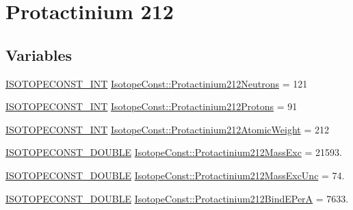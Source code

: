 \hypertarget{group___isotope_const-_protactinium-_pa212}{}\section{Protactinium 212}
\label{group___isotope_const-_protactinium-_pa212}
\subsection*{Variables}
\begin{DoxyCompactItemize}
\item 
\mbox{\hyperlink{group___isotope_const-_macros_ga5f18360b3e99483a35c32d789e62621c}{I\+S\+O\+T\+O\+P\+E\+C\+O\+N\+S\+T\+\_\+\+I\+NT}} \mbox{\hyperlink{group___isotope_const-_protactinium-_pa212_ga4a3f992ef16926a17d884f79e3f30dc9}{Isotope\+Const\+::\+Protactinium212\+Neutrons}} = 121
\item 
\mbox{\hyperlink{group___isotope_const-_macros_ga5f18360b3e99483a35c32d789e62621c}{I\+S\+O\+T\+O\+P\+E\+C\+O\+N\+S\+T\+\_\+\+I\+NT}} \mbox{\hyperlink{group___isotope_const-_protactinium-_pa212_ga0b88c59bc62d9ab09d5d554972699c88}{Isotope\+Const\+::\+Protactinium212\+Protons}} = 91
\item 
\mbox{\hyperlink{group___isotope_const-_macros_ga5f18360b3e99483a35c32d789e62621c}{I\+S\+O\+T\+O\+P\+E\+C\+O\+N\+S\+T\+\_\+\+I\+NT}} \mbox{\hyperlink{group___isotope_const-_protactinium-_pa212_gab0808915fbb114ea657ec5657615a8d1}{Isotope\+Const\+::\+Protactinium212\+Atomic\+Weight}} = 212
\item 
\mbox{\hyperlink{group___isotope_const-_macros_ga8f45a7272ce02c0b4c65c44636ed719a}{I\+S\+O\+T\+O\+P\+E\+C\+O\+N\+S\+T\+\_\+\+D\+O\+U\+B\+LE}} \mbox{\hyperlink{group___isotope_const-_protactinium-_pa212_gacb61aee2c5278a8a2a04923978b650a2}{Isotope\+Const\+::\+Protactinium212\+Mass\+Exc}} = 21593.
\item 
\mbox{\hyperlink{group___isotope_const-_macros_ga8f45a7272ce02c0b4c65c44636ed719a}{I\+S\+O\+T\+O\+P\+E\+C\+O\+N\+S\+T\+\_\+\+D\+O\+U\+B\+LE}} \mbox{\hyperlink{group___isotope_const-_protactinium-_pa212_ga161943566bc26126dda4522c8cb23878}{Isotope\+Const\+::\+Protactinium212\+Mass\+Exc\+Unc}} = 74.
\item 
\mbox{\hyperlink{group___isotope_const-_macros_ga8f45a7272ce02c0b4c65c44636ed719a}{I\+S\+O\+T\+O\+P\+E\+C\+O\+N\+S\+T\+\_\+\+D\+O\+U\+B\+LE}} \mbox{\hyperlink{group___isotope_const-_protactinium-_pa212_ga63ef08d948d86c4f1384d289d53c72e0}{Isotope\+Const\+::\+Protactinium212\+Bind\+E\+PerA}} = 7633.

\end{DoxyCompactItemize}
